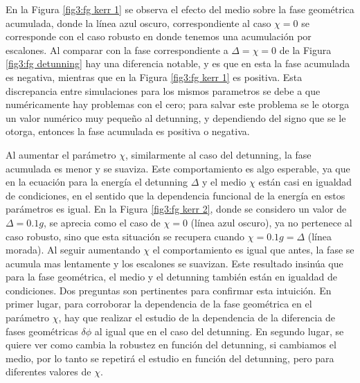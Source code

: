 En la Figura \ref{fig3:fg kerr 1} se observa el efecto del medio sobre la fase geométrica acumulada, donde la línea azul oscuro, correspondiente al caso $\chi=0$ se corresponde con el caso robusto en donde tenemos una acumulación por escalones. Al comparar con la fase correspondiente a $\Delta=\chi=0$ de la Figura \ref{fig3:fg detunning} hay una diferencia notable, y es que en esta la fase acumulada es negativa, mientras que en la Figura \ref{fig3:fg kerr 1} es positiva. Esta discrepancia entre simulaciones para los mismos parametros se debe a que numéricamente hay problemas con el cero; para salvar este problema se le otorga un valor numérico muy pequeño al detunning, y dependiendo del signo que se le otorga, entonces la fase acumulada es positiva o negativa. 

Al aumentar el parámetro $\chi$, similarmente al caso del detunning, la fase acumulada es menor y se suaviza. Este comportamiento es algo esperable, ya que en la ecuación para la energía el detunning $\Delta$ y el medio $\chi$ están casi en igualdad de condiciones, en el sentido que la dependencia funcional de la energía en estos parámetros es igual.
En la Figura \ref{fig3:fg kerr 2}, donde se considero un valor de $\Delta=0.1g$, se aprecia como el caso de $\chi=0$ (línea azul oscuro), ya no pertenece al caso robusto, sino que esta situación se recupera cuando $\chi=0.1g=\Delta$ (línea morada). Al seguir aumentando $\chi$ el comportamiento es igual que antes, la fase se acumula mas lentamente y los escalones se suavizan. 
Este resultado insinúa que para la fase geométrica, el medio y el detunning también están en igualdad de condiciones. Dos preguntas son pertinentes para confirmar esta intuición. En primer lugar, para corroborar la dependencia de la fase geométrica en el parámetro $\chi$, hay que realizar el estudio de la dependencia de la diferencia de fases geométricas $\delta\phi$ al igual que en el caso del detunning. En segundo lugar, se quiere ver como cambia la robustez en función del detunning, si cambiamos el medio, por lo tanto se repetirá el estudio en función del detunning, pero para diferentes valores de $\chi$.
